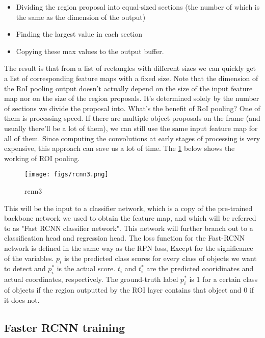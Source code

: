 \begin{itemize}
	\item Dividing the region proposal into equal-sized sections (the number of which is the same as the dimension of the output)
	\item Finding the largest value in each section
	\item Copying these max values to the output buffer.
\end{itemize}

The result is that from a list of rectangles with different sizes we can quickly get a list of corresponding feature maps with a fixed size. Note that the dimension of the RoI pooling output doesn’t actually depend on the size of the input feature map nor on the size of the region proposals. It’s determined solely by the number of sections we divide the proposal into. What’s the benefit of RoI pooling? One of them is processing speed. If there are multiple object proposals on the frame (and usually there’ll be a lot of them), we can still use the same input feature map for all of them. Since computing the convolutions at early stages of processing is very expensive, this approach can save us a lot of time. The \cref{fig:rcnn3} below shows the working of ROI pooling.

\begin{figure}[!htpb]
	\centering
	\texttt{[image: figs/rcnn3.png]}
	\caption{rcnn3}\label{fig:rcnn3}
\end{figure}

This will be the input to a classifier network, which is a copy of the pre-trained backbone network we used to obtain the feature map, and which will be referred to as "Fast RCNN classifier network". This network will further branch out to a classification head and regression head. The loss function for the Fast-RCNN network is defined in the same way as the RPN loss, Except for the significance of the variables. $p_{i}$ is the predicted class scores for every class of objects we want to detect and $p_{i}^*$ is the actual score. $t_{i}$ and $t_{i}^*$ are the predicted cooridinates and actual coordinates, respectively. The ground-truth label $p_{i}^*$ is 1 for a certain class of objects if the region outputted by the ROI layer contains that object and 0 if it does not.

\subsection{Faster RCNN training}

